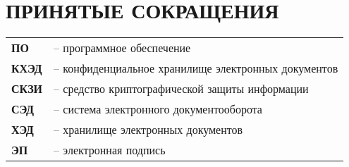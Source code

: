 \chapter*{ПРИНЯТЫЕ СОКРАЩЕНИЯ}
\begin{tabular}{ll}
\textbf{ПО} & -- программное обеспечение \\
\textbf{КХЭД} & -- конфиденциальное хранилище электронных документов \\
\textbf{СКЗИ} & -- средство криптографической защиты информации \\
\textbf{СЭД} & -- система электронного документооборота \\
\textbf{ХЭД} & -- хранилище электронных документов \\
\textbf{ЭП} & -- электронная подпись \\
\end{tabular}
\clearpage
